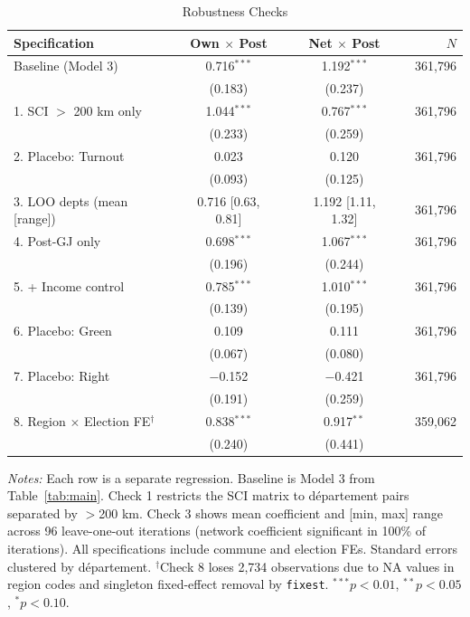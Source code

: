 \documentclass[12pt]{article}
\newcommand{\dept}{d\'{e}partement}
\begin{document}
\begin{table}[H]
\centering
\caption{Robustness Checks}
\label{tab:robustness}
\begin{threeparttable}
\begin{tabular}{@{}lccccr@{}}
\toprule
Specification & Own $\times$ Post & & Net $\times$ Post & & $N$ \\
\midrule
Baseline (Model 3)  & 0.716$^{***}$ & & 1.192$^{***}$ & & 361,796 \\
                     & (0.183) & & (0.237) & & \\[3pt]
1. SCI $>$ 200 km only   & 1.044$^{***}$ & & 0.767$^{***}$ & & 361,796 \\
                     & (0.233) & & (0.259) & & \\[3pt]
2. Placebo: Turnout  & 0.023 & & 0.120 & & 361,796 \\
                     & (0.093) & & (0.125) & & \\[3pt]
3. LOO depts (mean [range])  & 0.716 [0.63, 0.81] & & 1.192 [1.11, 1.32] & & 361,796 \\[3pt]
4. Post-GJ only      & 0.698$^{***}$ & & 1.067$^{***}$ & & 361,796 \\
                     & (0.196) & & (0.244) & & \\[3pt]
5. + Income control   & 0.785$^{***}$ & & 1.010$^{***}$ & & 361,796 \\
                     & (0.139) & & (0.195) & & \\[3pt]
6. Placebo: Green     & 0.109 & & 0.111 & & 361,796 \\
                     & (0.067) & & (0.080) & & \\[3pt]
7. Placebo: Right     & $-$0.152 & & $-$0.421 & & 361,796 \\
                     & (0.191) & & (0.259) & & \\[3pt]
8. Region $\times$ Election FE$^{\dagger}$ & 0.838$^{***}$ & & 0.917$^{**}$ & & 359,062 \\
                     & (0.240) & & (0.441) & & \\
\bottomrule
\end{tabular}
\begin{tablenotes}
\small
\item \textit{Notes:} Each row is a separate regression. Baseline is Model 3 from Table~\ref{tab:main}. Check 1 restricts the SCI matrix to \dept{} pairs separated by $>$200 km. Check 3 shows mean coefficient and [min, max] range across 96 leave-one-out iterations (network coefficient significant in 100\% of iterations). All specifications include commune and election FEs. Standard errors clustered by \dept{}. $^{\dagger}$Check 8 loses 2,734 observations due to NA values in region codes and singleton fixed-effect removal by \texttt{fixest}. $^{***}p<0.01$, $^{**}p<0.05$, $^{*}p<0.10$.
\end{tablenotes}
\end{threeparttable}
\end{table}
\end{document}
